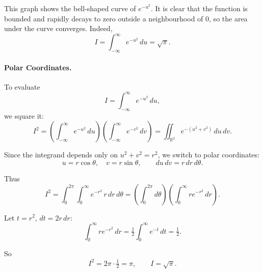 \documentclass[11pt,a4paper]{article}
\begin{document}
This graph shows the bell-shaped curve of $e^{-u^2}$.  
It is clear that the function is bounded and rapidly decays to zero outside a neighbourhood of $0$, so the area under the curve converges.  
Indeed,
\[
I=\int_{-\infty}^{\infty} e^{-u^2}\,du = \sqrt{\pi}.
\]


\paragraph{Polar Coordinates.}
To evaluate
\[
I=\int_{-\infty}^{\infty} e^{-u^2}\,du,
\]
we square it:
\[
I^2=\left(\int_{-\infty}^{\infty} e^{-u^2}\,du\right)
\left(\int_{-\infty}^{\infty} e^{-v^2}\,dv\right)
=\iint_{\mathbb{R}^2} e^{-(u^2+v^2)}\,du\,dv.
\]

Since the integrand depends only on $u^2+v^2=r^2$, we switch to polar coordinates:
\[
u=r\cos\theta,\quad v=r\sin\theta, \qquad du\,dv = r\,dr\,d\theta.
\]

Thus
\[
I^2=\int_0^{2\pi}\int_0^\infty e^{-r^2}\,r\,dr\,d\theta
= \left(\int_0^{2\pi} d\theta\right)\left(\int_0^\infty r e^{-r^2}\,dr\right).
\]

Let $t=r^2$, $dt=2r\,dr$:
\[
\int_0^\infty r e^{-r^2}\,dr=\tfrac{1}{2}\int_0^\infty e^{-t}\,dt=\tfrac{1}{2}.
\]

So
\[
I^2=2\pi\cdot \tfrac{1}{2}=\pi,\qquad I=\sqrt{\pi}.
\]
\end{document}
